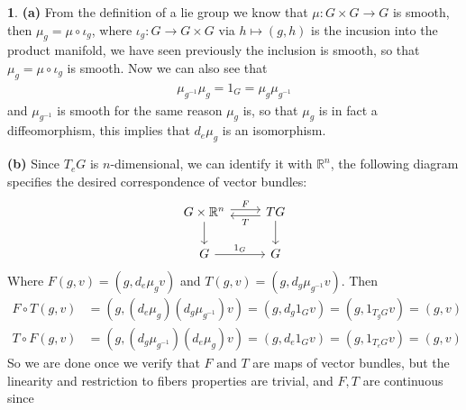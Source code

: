 \documentclass[10.5pt]{article}
\theoremstyle{definition}
\newtheorem{pb}{}
\newcommand{\tand}{\text{ and }}
\begin{document}
    \begin{pb}
        \textbf{(a)} From the definition of a lie group we know that \(\mu: G\times G \to G\) is smooth, then \(\mu_g = \mu \circ \iota_g\), where \(\iota_g: G \to G \times G\) via \(h \mapsto (g,h)\) is the incusion into the product manifold, we have seen previously the inclusion is smooth, so that \(\mu_g = \mu \circ\iota_g\) is smooth. Now we can also see that
        \begin{align*}
            \mu_{g^{-1}}\mu_g = 1_G = \mu_g\mu_{g^{-1}}
        \end{align*}
        and \(\mu_{g^{-1}}\) is smooth for the same reason \(\mu_g\) is, so that \(\mu_g\) is in fact a diffeomorphism, this implies that \(d_e\mu_g\) is an isomorphism.

        \textbf{(b)} Since \(T_eG\) is \(n\)-dimensional, we can identify it with \(\mathbb{R}^n\), the following diagram specifies the desired correspondence of vector bundles:
        \begin{equation*}
            \begin{tikzcd}
            G\times \mathbb{R}^n \arrow[d] \arrow[r,"F",shift left=1] &TG \arrow[l,"T", shift left = 1] \arrow[d] \\
            G \arrow[r, "1_G"] & G
            \end{tikzcd}
        \end{equation*}
        Where \(F(g,v) = (g,d_e\mu_g v)\) and \(T(g,v) = (g,d_g\mu_{g^{-1}}v)\). Then
        \begin{align*}
            F\circ T(g,v) &= (g,(d_e\mu_g)(d_g\mu_{g^{-1}})v) = (g,d_g1_{G}v) = (g,1_{T_gG}v) = (g,v) \\
            T\circ F(g,v) &= (g,(d_g\mu_{g^{-1}})(d_e\mu_g)v) = (g,d_e1_G v) = (g,1_{T_eG}v) = (g,v)
        \end{align*}
        So we are done once we verify that \(F \tand T\) are maps of vector bundles, but the linearity and restriction to fibers properties are trivial, and \(F,T\) are continuous since
    \end{pb}
\end{document}

